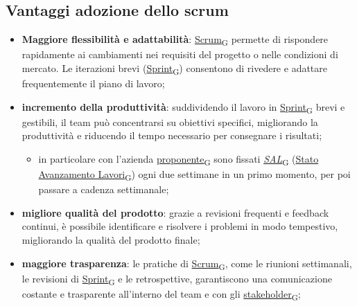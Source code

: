 \subsection{Vantaggi adozione dello scrum}
\begin{itemize}
	\item \textbf{Maggiore flessibilità e adattabilità}: \href{https://7last.github.io/docs/rtb/documentazione-interna/glossario\#scrum}{Scrum\textsubscript{G}} permette di rispondere rapidamente ai cambiamenti nei requisiti del progetto o nelle condizioni di mercato. Le iterazioni brevi (\href{https://7last.github.io/docs/rtb/documentazione-interna/glossario\#sprint}{Sprint\textsubscript{G}}) consentono di rivedere e adattare frequentemente il piano di lavoro;
	\item \textbf{incremento della produttività}: suddividendo il lavoro in \href{https://7last.github.io/docs/rtb/documentazione-interna/glossario\#sprint}{Sprint\textsubscript{G}} brevi e gestibili, il team può concentrarsi su obiettivi specifici, migliorando la produttività e riducendo il tempo necessario per consegnare i risultati;
	      \begin{itemize}
		      \item in particolare con l’azienda \href{https://7last.github.io/docs/rtb/documentazione-interna/glossario\#proponente}{proponente\textsubscript{G}} sono fissati \href{https://7last.github.io/docs/rtb/documentazione-interna/glossario\#stato-avanzamento-lavori}{\textit{SAL}\textsubscript{G}} (\href{https://7last.github.io/docs/rtb/documentazione-interna/glossario\#stato-avanzamento-lavori}{Stato Avanzamento Lavori\textsubscript{G}}) ogni due settimane in un primo momento, per poi passare a cadenza settimanale;
	      \end{itemize}
	\item \textbf{migliore qualità del prodotto}: grazie a revisioni frequenti e feedback continui, è possibile identificare e risolvere i problemi in modo tempestivo, migliorando la qualità del prodotto finale;
	\item \textbf{maggiore trasparenza}: le pratiche di \href{https://7last.github.io/docs/rtb/documentazione-interna/glossario\#scrum}{Scrum\textsubscript{G}}, come le riunioni settimanali, le revisioni di \href{https://7last.github.io/docs/rtb/documentazione-interna/glossario\#sprint}{Sprint\textsubscript{G}} e le retrospettive, garantiscono una comunicazione costante e trasparente all'interno del team e con gli \href{https://7last.github.io/docs/rtb/documentazione-interna/glossario\#stakeholder}{stakeholder\textsubscript{G}};

\end{itemize}
